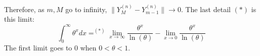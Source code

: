 Therefore, as $m,M$ go to infinity, $\|Y_{M}^{(n)} - Y_{m-1}^{(n)}\|\to 0$. The last detail $(*)$ is this limit:
\[ \int_0^{\infty} \theta^{x} dx =^{(*)} \lim_{x \to \infty} \frac{\theta^x}{\ln(\theta)} - \lim_{x \to 0} \frac{\theta^x}{\ln(\theta)}\]
The first limit goes to $0$ when $0< \theta < 1$.